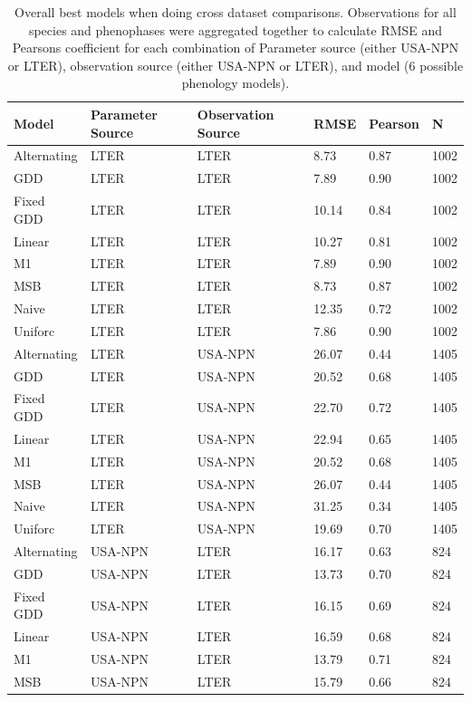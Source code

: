 \newpage
\begin{table}
    \caption[Overall best models when doing cross dataset comparisons]{Overall best models when doing cross dataset comparisons. Observations for all species and phenophases were aggregated together to calculate RMSE and Pearsons coefficient for each combination of Parameter source (either USA-NPN or LTER), observation source (either USA-NPN or LTER), and model (6 possible phenology models). }
    \label{table-a-2}
\begin{tabularx}{6.5in}{XXXXXX}
\hline
Model & Parameter Source & Observation Source & RMSE & Pearson & N\\
\hline


Alternating & LTER & LTER & 8.73 & 0.87 & 1002\\
GDD & LTER & LTER & 7.89 & 0.90 & 1002\\
Fixed GDD & LTER & LTER & 10.14 & 0.84 & 1002\\
Linear & LTER & LTER & 10.27 & 0.81 & 1002\\
M1 & LTER & LTER & 7.89 & 0.90 & 1002\\
MSB & LTER & LTER & 8.73 & 0.87 & 1002\\
Naive & LTER & LTER & 12.35 & 0.72 & 1002\\
Uniforc & LTER & LTER & 7.86 & 0.90 & 1002\\
Alternating & LTER & USA-NPN & 26.07 & 0.44 & 1405\\
GDD & LTER & USA-NPN & 20.52 & 0.68 & 1405\\
Fixed GDD & LTER & USA-NPN & 22.70 & 0.72 & 1405\\
Linear & LTER & USA-NPN & 22.94 & 0.65 & 1405\\
M1 & LTER & USA-NPN & 20.52 & 0.68 & 1405\\
MSB & LTER & USA-NPN & 26.07 & 0.44 & 1405\\
Naive & LTER & USA-NPN & 31.25 & 0.34 & 1405\\
Uniforc & LTER & USA-NPN & 19.69 & 0.70 & 1405\\
Alternating & USA-NPN & LTER & 16.17 & 0.63 & 824\\
GDD & USA-NPN & LTER & 13.73 & 0.70 & 824\\
Fixed GDD & USA-NPN & LTER & 16.15 & 0.69 & 824\\
Linear & USA-NPN & LTER & 16.59 & 0.68 & 824\\
M1 & USA-NPN & LTER & 13.79 & 0.71 & 824\\
MSB & USA-NPN & LTER & 15.79 & 0.66 & 824\\

\end{tabularx}
\end{table}
